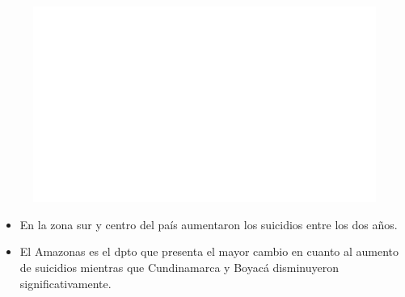     \begin{figure}[H]
        \caption[Lesiones autoinfligidas intencionalmente (suicidios) por departamentos (mapa) - 2010 VS 2020 ]{\label{suicid_dpto_map} }
        \begin{center}
        \includegraphics[width=\textwidth,keepaspectratio]{img/var_294_map.png}
        \end{center}
    \end{figure}
            \begin{itemize}
                \item En la zona sur y centro del país aumentaron los suicidios entre los dos años.
                \item El Amazonas es el dpto que presenta el mayor cambio en cuanto al aumento de suicidios mientras que Cundinamarca y Boyacá disminuyeron significativamente.
                \end{itemize}

